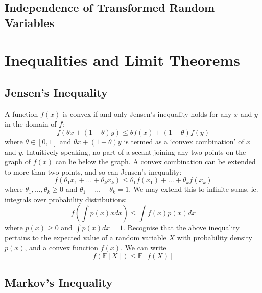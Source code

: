 \documentclass[11pt]{report} %
\begin{document}
\subsection{Independence of Transformed Random Variables}

\section{Inequalities and Limit Theorems}

\subsection{Jensen's Inequality}

A function $f\left(x\right)$ is convex if and only Jensen's inequality holds for any $x$ and $y$ in the domain of $f$:
\begin{equation}
f\left(\theta x + \left(1 - \theta\right)y\right) \leq \theta f\left(x\right) + \left(1 - \theta\right)f\left(y\right)
\end{equation}
where $\theta \in \left[0, 1\right]$ and $\theta x + \left(1 - \theta\right)y$ is termed as a `convex combination' of $x$ and $y$. Intuitively speaking, no part of a secant joining any two points on the graph of $f\left(x\right)$ can lie below the graph. A convex combination can be extended to more than two points, and so can Jensen's inequality:
\begin{equation}
f\left(\theta_{1}x_{1} + \dots + \theta_{k}x_{k}\right) \leq \theta_{1}f\left(x_{1}\right) + \dots + \theta_{k}f\left(x_{k}\right)
\end{equation}
where $\theta_{1}, \dots, \theta_{k} \geq 0$ and $\theta_{1} + \dots + \theta_{k} = 1$. We may extend this to infinite sums, ie. integrals over probability distributions:
\begin{equation}
f\left(\int p\left(x\right) x dx\right) \leq \int f\left(x\right)p\left(x\right) dx
\end{equation}
where $p\left(x\right) \geq 0$ and $\int p\left(x\right) dx = 1$. Recognise that the above inequality pertains to the expected value of a random variable $X$ with probability density $p\left(x\right)$, and a convex function $f\left(x\right)$. We can write
\begin{equation}
f\left(\mathbb{E}\left[X\right]\right) \leq \mathbb{E}\left[f\left(X\right)\right]
\end{equation}

\subsection{Markov's Inequality}
\end{document}
